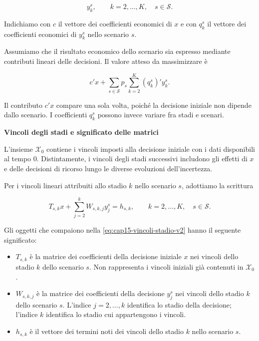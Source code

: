 \[
y_k^s,
\qquad k=2,\ldots,K,
\quad s\in\mathcal S.
\]

Indichiamo con $c$ il vettore
dei coefficienti economici di $x$
e con $q_k^s$ il vettore dei
coefficienti economici di $y_k^s$
nello scenario $s$.

Assumiamo che il risultato economico
dello scenario sia espresso mediante
contributi lineari delle decisioni.
Il valore atteso da massimizzare \`e

\[
c'x+
\sum_{s\in\mathcal S}p_s
\sum_{k=2}^{K}(q_k^s)'y_k^s.
\]

Il contributo $c'x$ compare una sola
volta, poich\'e la decisione iniziale
non dipende dallo scenario. I coefficienti
$q_k^s$ possono invece variare
fra stadi e scenari.

\medskip

\noindent
\textbf{Vincoli degli stadi e significato delle matrici}

L'insieme $\mathcal X_0$ contiene
i vincoli imposti alla decisione
iniziale con i dati disponibili
al tempo $0$. Distintamente,
i vincoli degli stadi successivi
includono gli effetti di $x$
e delle decisioni di ricorso
lungo le diverse evoluzioni
dell'incertezza.

Per i vincoli lineari attribuiti
allo stadio $k$ nello scenario
$s$, adottiamo la scrittura

\begin{equation}
T_{s,k}x+
\sum_{j=2}^{k}W_{s,k,j}y_j^s
=
h_{s,k},
\qquad
k=2,\ldots,K,\quad s\in\mathcal S.
\label{eq:cap15-vincoli-stadio-v2}
\end{equation}

Gli oggetti che compaiono nella
\eqref{eq:cap15-vincoli-stadio-v2}
hanno il seguente significato:

\begin{itemize}

\item $T_{s,k}$ \`e la matrice
dei coefficienti della decisione
iniziale $x$ nei vincoli dello
stadio $k$ dello scenario $s$.
Non rappresenta i vincoli iniziali
gi\`a contenuti in $\mathcal X_0$.

\item $W_{s,k,j}$ \`e la matrice
dei coefficienti della decisione
$y_j^s$ nei vincoli dello stadio
$k$ dello scenario $s$.
L'indice $j=2,...,k$ identifica lo stadio
della decisione; l'indice $k$
identifica lo stadio cui
appartengono i vincoli.

\item $h_{s,k}$ \`e il vettore
dei termini noti dei vincoli
dello stadio $k$ nello scenario $s$.

\end{itemize}

